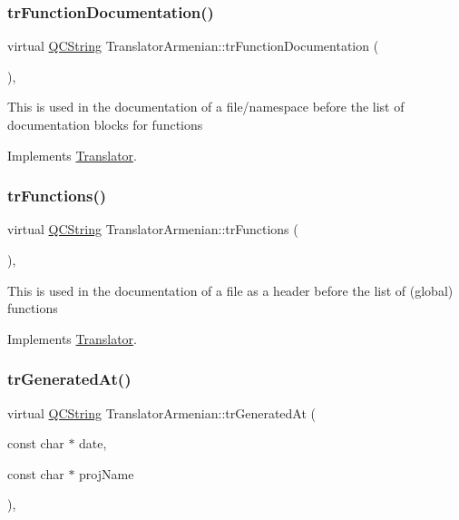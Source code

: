 \subsubsection{\texorpdfstring{trFunctionDocumentation()}{trFunctionDocumentation()}}
{\footnotesize\ttfamily virtual \mbox{\hyperlink{class_q_c_string}{Q\+C\+String}} Translator\+Armenian\+::tr\+Function\+Documentation (\begin{DoxyParamCaption}{ }\end{DoxyParamCaption})\hspace{0.3cm}{\ttfamily [inline]}, {\ttfamily [virtual]}}

This is used in the documentation of a file/namespace before the list of documentation blocks for functions 

Implements \mbox{\hyperlink{class_translator}{Translator}}.

\mbox{\label{class_translator_armenian_a47a89e2fff884ae74eb1521ccb3c4c3d}} 
\subsubsection{\texorpdfstring{trFunctions()}{trFunctions()}}
{\footnotesize\ttfamily virtual \mbox{\hyperlink{class_q_c_string}{Q\+C\+String}} Translator\+Armenian\+::tr\+Functions (\begin{DoxyParamCaption}{ }\end{DoxyParamCaption})\hspace{0.3cm}{\ttfamily [inline]}, {\ttfamily [virtual]}}

This is used in the documentation of a file as a header before the list of (global) functions 

Implements \mbox{\hyperlink{class_translator}{Translator}}.

\mbox{\label{class_translator_armenian_a454be2835e6068866371d104c62bbefb}} 
\subsubsection{\texorpdfstring{trGeneratedAt()}{trGeneratedAt()}}
{\footnotesize\ttfamily virtual \mbox{\hyperlink{class_q_c_string}{Q\+C\+String}} Translator\+Armenian\+::tr\+Generated\+At (\begin{DoxyParamCaption}\item[{const char $\ast$}]{date,  }\item[{const char $\ast$}]{proj\+Name }\end{DoxyParamCaption})\hspace{0.3cm}{\ttfamily [inline]}, {\ttfamily [virtual]}}


